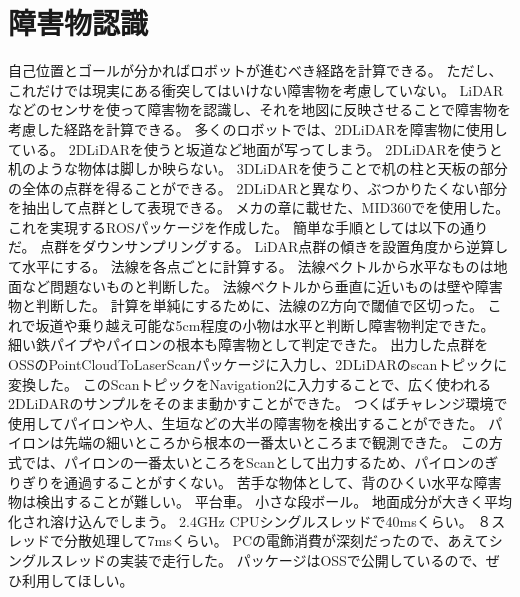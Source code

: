 \section{障害物認識}
自己位置とゴールが分かればロボットが進むべき経路を計算できる。
ただし、これだけでは現実にある衝突してはいけない障害物を考慮していない。
LiDARなどのセンサを使って障害物を認識し、それを地図に反映させることで障害物を考慮した経路を計算できる。
多くのロボットでは、2DLiDARを障害物に使用している。
2DLiDARを使うと坂道など地面が写ってしまう。
2DLiDARを使うと机のような物体は脚しか映らない。
3DLiDARを使うことで机の柱と天板の部分の全体の点群を得ることができる。
2DLiDARと異なり、ぶつかりたくない部分を抽出して点群として表現できる。
メカの章に載せた、MID360でを使用した。
これを実現するROSパッケージを作成した。
簡単な手順としては以下の通りだ。
点群をダウンサンプリングする。
LiDAR点群の傾きを設置角度から逆算して水平にする。
法線を各点ごとに計算する。
法線ベクトルから水平なものは地面など問題ないものと判断した。
法線ベクトルから垂直に近いものは壁や障害物と判断した。
計算を単純にするために、法線のZ方向で閾値で区切った。
これで坂道や乗り越え可能な5cm程度の小物は水平と判断し障害物判定できた。
細い鉄パイプやパイロンの根本も障害物として判定できた。
出力した点群をOSSのPointCloudToLaserScanパッケージに入力し、2DLiDARのscanトピックに変換した。
このScanトピックをNavigation2に入力することで、広く使われる2DLiDARのサンプルをそのまま動かすことができた。
つくばチャレンジ環境で使用してパイロンや人、生垣などの大半の障害物を検出することができた。
パイロンは先端の細いところから根本の一番太いところまで観測できた。
この方式では、パイロンの一番太いところをScanとして出力するため、パイロンのぎりぎりを通過することがすくない。
苦手な物体として、背のひくい水平な障害物は検出することが難しい。
平台車。
小さな段ボール。
地面成分が大きく平均化され溶け込んでしまう。
2.4GHz CPUシングルスレッドで40msくらい。
８スレッドで分散処理して7msくらい。
PCの電飾消費が深刻だったので、あえてシングルスレッドの実装で走行した。
パッケージはOSSで公開しているので、ぜひ利用してほしい。